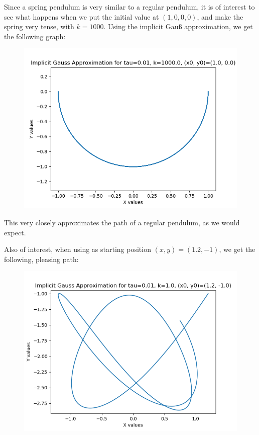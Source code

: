 \documentclass{article}
\theoremstyle{definition}
\begin{document}
\begin{itemize}
\begin{figure}[H]
		\end{figure}

		Since a spring pendulum is very similar to a regular pendulum,
		it is of interest to see what happens when we put the initial
		value at $(1, 0, 0, 0)$, and make the spring very tense, with
		$k=1000$.  Using the implicit Gau{\ss} approximation, we get the
		following graph:
		\begin{figure}[H]
			\includegraphics[scale=0.6]{gauss_spring_001_1000_1_0}
		\end{figure}
		This very closely approximates the path of a regular pendulum,
		as we would expect.

		Also of interest, when using as starting position $(x, y) =
		(1.2, -1)$, we get the following, pleasing path:

		\begin{figure}[H]
			\includegraphics[scale=0.6]{gauss_spring_001_1_12_1}
		\end{figure}
\end{itemize}
\end{document}
